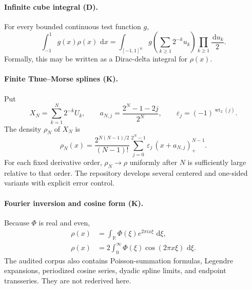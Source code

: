 \documentclass[11pt]{article}
\theoremstyle{definition}
\theoremstyle{remark}
\newcommand{\R}{\mathbb R}
\newcommand{\N}{\mathbb N}
\newcommand{\dd}{\,\mathrm d}
\newcommand{\wt}{\operatorname{wt}_2}
\newcommand{\eps}{\varepsilon}
\newcommand{\statusknown}{\textsf{K}}
\newcommand{\statusderived}{\textsf{D}}
\begin{document}
\paragraph{Infinite cube integral (\statusderived).}
For every bounded continuous test function \(g\),
\begin{equation}
 \int_{-1}^{1}g(x)\rho(x)\,\dd x
 =\int_{[-1,1]^{\N}}g\!\left(\sum_{k\ge1}2^{-k}u_k\right)
   \prod_{k\ge1}\frac{\dd u_k}{2}.                           \label{eq:cube-pushforward}
\end{equation}
Formally, this may be written as a Dirac-delta integral for \(\rho(x)\).

\paragraph{Finite Thue--Morse splines (\statusknown).}
Put
\begin{equation}
 X_N=\sum_{k=1}^{N}2^{-k}U_k,
 \qquad
 a_{N,j}=\frac{2^N-1-2j}{2^N},
 \qquad
 \eps_j=(-1)^{\wt(j)}.                                      \label{eq:aNj}
\end{equation}
The density \(\rho_N\) of \(X_N\) is
\begin{equation}
 \rho_N(x)=\frac{2^{N(N-1)/2}}{(N-1)!}
 \sum_{j=0}^{2^N-1}\eps_j\,(x+a_{N,j})_+^{N-1}.             \label{eq:finite-spline}
\end{equation}
For each fixed derivative order, \(\rho_N\to\rho\) uniformly after \(N\) is sufficiently
large relative to that order.  The repository develops several centered and one-sided
variants with explicit error control.

\paragraph{Fourier inversion and cosine form (\statusknown).}
Because \(\Phi\) is real and even,
\begin{align}
 \rho(x)&=\int_{\R}\Phi(\xi)e^{2\pi i x\xi}\,\dd\xi,
                                                                  \label{eq:rho-fourier-inversion}\\
 \rho(x)&=2\int_0^{\infty}\Phi(\xi)\cos(2\pi x\xi)\,\dd\xi.
                                                                  \label{eq:rho-cosine}
\end{align}
The audited corpus also contains Poisson-summation formulas, Legendre expansions,
periodized cosine series, dyadic spline limits, and endpoint transseries.  They are not
rederived here.
\end{document}
